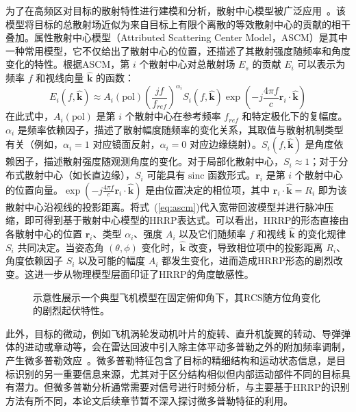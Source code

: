 为了在高频区对目标的散射特性进行建模和分析，散射中心模型被广泛应用~\cite{X}。该模型将目标的总散射场近似为来自目标上有限个离散的等效散射中心的贡献的相干叠加。属性散射中心模型（Attributed Scattering Center Model，ASCM）是其中一种常用模型，它不仅给出了散射中心的位置，还描述了其散射强度随频率和角度变化的特性。根据ASCM，第 $i$ 个散射中心对总散射场 $E_s$ 的贡献 $E_i$ 可以表示为频率 $f$ 和视线向量 $\hat{\mathbf{k}}$ 的函数：
\begin{equation}
    E_i(f, \hat{\mathbf{k}}) \approx A_i(\text{pol}) \left(\frac{j f}{f_{ref}}\right)^{\alpha_i} S_i(f, \hat{\mathbf{k}}) \exp\left(-j \frac{4\pi f}{c} \mathbf{r}_i \cdot \hat{\mathbf{k}}\right)
    \label{eq:ascm}
\end{equation}
在此式中，$A_i(\text{pol})$ 是第 $i$ 个散射中心在参考频率 $f_{ref}$ 和特定极化下的复幅度。$\alpha_i$ 是频率依赖因子，描述了散射幅度随频率的变化关系，其取值与散射机制类型有关（例如，$\alpha_i=1$ 对应镜面反射，$\alpha_i=0$ 对应边缘绕射）。$S_i(f, \hat{\mathbf{k}})$ 是角度依赖因子，描述散射强度随观测角度的变化。对于局部化散射中心，$S_i \approx 1$；对于分布式散射中心（如长直边缘），$S_i$ 可能具有 $\text{sinc}$ 函数形式。$\mathbf{r}_i$ 是第 $i$ 个散射中心的位置向量。$\exp(-j \frac{4\pi f}{c} \mathbf{r}_i \cdot \hat{\mathbf{k}})$ 是由位置决定的相位项，其中 $\mathbf{r}_i \cdot \hat{\mathbf{k}} = R_i$ 即为该散射中心沿视线的投影距离。将式~(\ref{eq:ascm})代入宽带回波模型并进行脉冲压缩，即可得到基于散射中心模型的HRRP表达式。可以看出，HRRP的形态直接由各散射中心的位置 $\mathbf{r}_i$、类型 $\alpha_i$、强度 $A_i$ 以及它们随频率 $f$ 和视线 $\hat{\mathbf{k}}$ 的变化规律 $S_i$ 共同决定。当姿态角 $(\theta, \phi)$ 变化时，$\hat{\mathbf{k}}$ 改变，导致相位项中的投影距离 $R_i$、角度依赖因子 $S_i$ 以及可能的幅度 $A_i$ 都发生变化，进而造成HRRP形态的剧烈改变。这进一步从物理模型层面印证了HRRP的角度敏感性。

\begin{figure}[h!]
    \centering
    \caption{示意性展示一个典型飞机模型在固定俯仰角下，其RCS随方位角变化的剧烈起伏特性。}
    \label{fig:rcs_angle}
\end{figure}

此外，目标的微动，例如飞机涡轮发动机叶片的旋转、直升机旋翼的转动、导弹弹体的进动或章动等，会在雷达回波中引入除主体平动多普勒之外的附加频率调制，产生微多普勒效应~\cite{X}。微多普勒特征包含了目标的精细结构和运动状态信息，是目标识别的另一重要信息来源，尤其对于区分结构相似但内部运动部件不同的目标具有潜力。但微多普勒分析通常需要对信号进行时频分析，与主要基于HRRP的识别方法有所不同，本论文后续章节暂不深入探讨微多普勒特征的利用。

